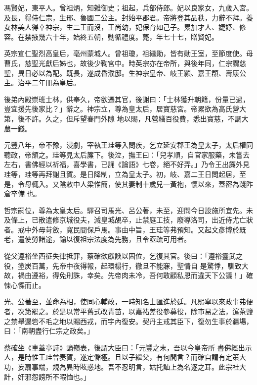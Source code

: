 \begin{pinyinscope}
 馮賢妃，東平人。曾祖炳，知雜御史；祖起，兵部侍郎。妃以良家女，九歲入宮。及長，得侍仁宗，生邢、魯國二公主。封始平郡君。帝將登其品秩，力辭不拜。養女林美人得幸神宗，生二王而沒，王尚幼，妃保育如己子。累加才人、婕妤、修容。在禁掖幾六十年，始終五朝，動循禮度。薨，年七十七，贈賢妃。



 英宗宣仁聖烈高皇后，亳州蒙城人。曾祖瓊，祖繼勛，皆有勛王室，至節度使。母曹氏，慈聖光獻后姊也，故後少鞠宮中。時英宗亦在帝所，與後年同，仁宗謂慈聖，異日必以為配。既長，遂成昏濮邸。生神宗皇帝、岐王顥、嘉王頵、壽康公主。治平二年冊為皇后。



 後弟內殿崇班士林，供奉久，帝欲遷其官，後謝曰：「士林獲升朝籍，份量已過，豈宜援先後家比？」辭之。神宗立，尊為皇太后，居寶慈宮。帝累欲為高氏營大第，後不許。久之，但斥望春門外隙
 地以賜，凡營繕百役費，悉出寶慈，不調大農一錢。



 元豐八年，帝不豫，浸劇，宰執王珪等入問疾，乞立延安郡王為皇太子，太后權同聽政，帝頷之。珪等見太后簾下。後泣，撫王曰：「兒孝順，自官家服藥，未嘗去左右，書佛經以祈福，喜學書，已誦《論語》七卷，絕不好弄。」乃令王出簾外見珪等，珪等再拜謝且賀。是日降制，立為皇太子。初，岐、嘉二王日問起居，至是，令母輒入。又陰敕中人梁惟簡，使其妻制十歲兒一黃袍，懷以來，蓋密為踐阼倉卒備
 也。



 哲宗嗣位，尊為太皇太后。驛召司馬光、呂公著，未至，迎問今日設施所宜先。未及條上，已散遣修京城役夫，減皇城覘卒，止禁庭工技，廢導洛司，出近侍尤亡狀者。戒中外毋苛斂，寬民間保戶馬。事由中旨，王珪等弗預知。又起文彥博於既老，遣使勞諸途，諭以復祖宗法度為先務，且令亟疏可用者。



 從父遵裕坐西征失律抵罪，蔡確欲獻諛以固位，乞復其官。後曰：「遵裕靈武之役，塗炭百萬，先帝中夜得報，起環榻行，徹旦不能寐，聖情自
 是驚悸，馴致大故，禍由遵裕，得免刑誅，幸矣。先帝肉未冷，吾何敢顧私恩而違天下公議！」確悚心慄而止。



 光、公著至，並命為相，使同心輔政，一時知名士匯進於廷。凡熙寧以來政事弗便者，次第罷之。於是以常平舊式改青苗，以嘉祐差役參募役，除市易之法，逭茶鹽之禁舉邊砦不毛之地以賜西戎，而宇內復安。契丹主戒其臣下，復勿生事於疆場，曰：「南朝盡行仁宗之政矣。」



 蔡確坐《車蓋亭詩》謫嶺表，後謂大臣曰：「元豐之末，吾以今皇帝所
 書佛經出示人，是時惟王珪曾奏賀，遂定儲極。且以子繼父，有何間言？而確自謂有定策大功，妄扇事端，規為異時眩惑地。吾不忍明言，姑托訕上為名逐之耳。此宗社大計，奸邪怨謗所不暇恤也。」




\end{pinyinscope}
